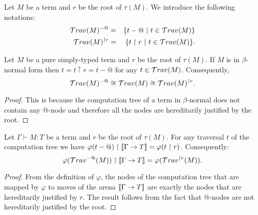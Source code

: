 Let $M$ be a term and $r$ be the root of $\tau(M)$. We introduce the following notations:
\begin{eqnarray*}
\mathcal{T}rav(M)^{-@} &=& \{ t - @ \ | \  t \in \mathcal{T}rav(M) \} \\
\mathcal{T}rav(M)^{\upharpoonright r} &=& \{ t  \upharpoonright r \ | \  t  \in \mathcal{T}rav(M) \} .
\end{eqnarray*}

\begin{lem}
Let $M$ be a pure simply-typed term and $r$ be the root of $\tau(M)$.
If $M$ is in $\beta$-normal form then $t = t \upharpoonright r = t - @$ for any $t \in \mathcal{T}rav(M)$.
Consequently,
$$\mathcal{T}rav(M)^{-@} \cong \mathcal{T}rav(M) \cong  \mathcal{T}rav(M)^{\upharpoonright r }.$$
\end{lem}
\begin{proof}
This is because the computation tree of a term in $\beta$-normal
does not contain any @-node and therefore all the nodes are
hereditarily justified by the root.
\end{proof}



\begin{lem} Let $\Gamma \vdash M :T$ be a term and $r$ be the root of $\tau(M)$.
\label{lem:varphi_filter}
For any traversal $t$ of the computation tree we have
$\varphi(t-@) \upharpoonright {[\![\Gamma \rightarrow T ]\!]} = \varphi(t\upharpoonright r)$.
Consequently:
$$ \varphi(\mathcal{T}rav^{-@}(M)) \upharpoonright {[\![\Gamma \rightarrow T ]\!]} = \varphi(\mathcal{T}rav^{\upharpoonright r}(M)).$$
\end{lem}
\begin{proof}
    From the definition of $\varphi$, the nodes of the computation tree that are mapped by $\varphi$
    to moves of the arena ${[\![ \Gamma \rightarrow T ]\!]}$ are exactly the nodes that are hereditarily justified by $r$.
    The result follows from the fact that @-nodes are not hereditarily justified by the root.
\end{proof}

